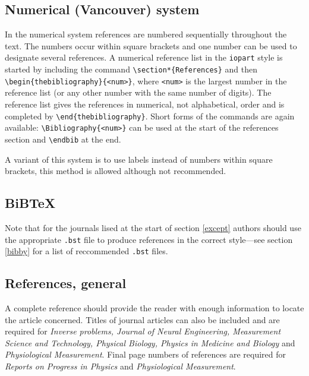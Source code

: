 \documentclass[12pt]{iopart}
\begin{document}
\subsection{Numerical (Vancouver) system}
In the numerical system references are numbered sequentially 
throughout the text. The numbers occur within square brackets and one 
number can be used to designate several references. A numerical 
reference list in the \verb"iopart" style is started by including the 
command \verb"\section*{References}" and then
\verb"\begin{thebibliography}{<num>}", where \verb"<num>" is the largest
number in the reference list (or any other number with the same number
of digits).  The 
reference list gives the references in 
numerical, not alphabetical, order and is completed by
\verb"\end{thebibliography}". Short forms of the commands are again
available: \verb"\Bibliography{<num>}" can be used at the start of the
references section and \verb"\endbib" at the end.

A variant of this system is to use labels instead of numbers within 
square brackets, this method is allowed although not recommended.

\subsection{BiBTeX\label{bibtex}}
Note that for the journals lised at the start of section {\ref{except}} authors should use the
appropriate \verb".bst" file to produce references in the correct style---see section \ref{bibby} for
a list of reccommended \verb".bst" files.

\subsection{References, general}
A complete reference should provide the reader with enough information to locate
the article concerned. Titles of journal articles can also be included and are
required for {\it Inverse problems, Journal of Neural Engineering, Measurement
Science and Technology, Physical Biology, Physics in Medicine and Biology\/} and
{\it Physiological Measurement}. Final page numbers of references are required
for {\it Reports on Progress in Physics\/} and {\it Physiological Measurement}.
\end{document}

